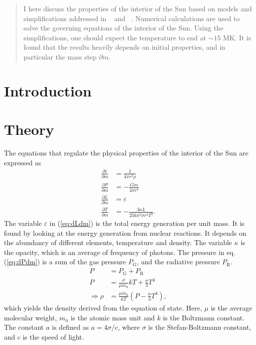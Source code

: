 \documentclass[a4paper, 11pt, english]{article}
\author{Vedad Hodzic}
\newcommand{\refeq}[1]{(\textcolor{red}{\ref{eq:#1}})} %
\begin{document}
\begin{titlepage}
    \thispagestyle{empty}
    
\end{titlepage}

\begin{abstract}
	I here discuss the properties of the interior of the Sun based on models and
	simplifications addressed in ~\cite{stix} and ~\cite{gudiksen}. Numerical calculations
	are used to solve the governing equations of the interior of the Sun. Using the 
	simplifications, one should expect the temperature to end at $\sim15$ MK. It is found
	that the results heavily depends on initial properties, and in particular the mass
	step $\partial m$.
\end{abstract}

\section{Introduction}

\section{Theory}

The equations that regulate the physical properties of the interior of the Sun are
expressed as
\begin{align}
	\frac{\partial r}{\partial m} &= \frac{1}{4\pi r^2 \rho} \label{eq:drdm} \\
	\frac{\partial P}{\partial m} &= -\frac{Gm}{4\pi r^4} \label{eq:dPdm} \\
	\frac{\partial L}{\partial m} &= \varepsilon \label{eq:dLdm} \\
	\frac{\partial T}{\partial m} &= -\frac{3 \kappa L}{256 \pi^2 \sigma r^4 T^3}. 
	\label{eq:dTdm} 
\end{align}
The variable $\varepsilon$ in \refeq{dLdm} is the total energy generation per unit mass.
It is found by looking at the energy generation from nuclear reactions. It depends on the
abundancy of different elements, temperature and density. The variable $\kappa$ is the
opacity, which is an average of frequency of photons.
The pressure in eq. \refeq{dPdm} is a sum of the gas pressure $P_{\mathrm{G}}$, and the radiative
pressure $P_{\mathrm{R}}$. 
\begin{align*}
	P &= P_{\mathrm{G}} + P_{\mathrm{R}} \\
	P &= \frac{\rho}{\mu m_{\mathrm{u}}} kT + \frac{a}{3}T^4 \\
	\Rightarrow \rho &= \frac{\mu m_{\mathrm{u}}}{kT} \left( P - \frac{a}{3}T^4 \right),
\end{align*}
which yields the density derived from the equation of state. Here, $\mu$ is the average
molecular weight, $m_{\mathrm{u}}$ is the atomic mass unit and $k$ is the Boltzmann
constant. The constant $a$ is defined as $a = 4\sigma / c$, where $\sigma$ is the
Stefan-Boltzmann constant, and $c$ is the speed of light.
\end{document}
